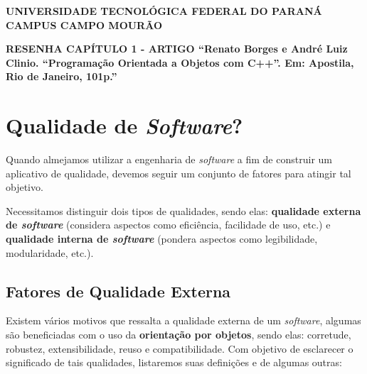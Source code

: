 \documentclass[a4paper, 12pt]{article}
\begin{document}
	
	\hspace{5cm}
	
	\begin{large}
		\begin{center}
			\textbf{UNIVERSIDADE TECNOLÓGICA FEDERAL DO PARANÁ}\newline
			\textbf{CAMPUS CAMPO MOURÃO}
		\end{center}
	\end{large}
	
	\vspace{0.5cm}
	
	\begin{center}
		\textbf{RESENHA CAPÍTULO 1 - ARTIGO ``Renato Borges e André Luiz Clinio. ``Programação Orientada a Objetos com C++''. Em: Apostila, Rio de Janeiro, 101p.''}
	\end{center}

	\vspace{0.5cm}
	
	\section{Qualidade de \textit{Software}?}
	
	\onehalfspacing
	Quando almejamos utilizar a engenharia de \textit{software} a fim de construir um aplicativo de qualidade, devemos seguir um conjunto de fatores para atingir tal objetivo.
	
	Necessitamos distinguir dois tipos de qualidades, sendo elas: \textbf{qualidade externa de \textit{software}} (considera aspectos como eficiência, facilidade de uso, etc.) e \textbf{qualidade interna de \textit{software}} (pondera aspectos como legibilidade, modularidade, etc.).
	
	\subsection{Fatores de Qualidade Externa}
	
	Existem vários motivos que ressalta a qualidade externa de um \textit{software}, algumas são beneficiadas com o uso da \textbf{orientação por objetos}, sendo elas: corretude, robustez, extensibilidade, reuso e compatibilidade. Com objetivo de esclarecer o significado de tais qualidades, listaremos suas definições e de algumas outras:
	
\end{document}
